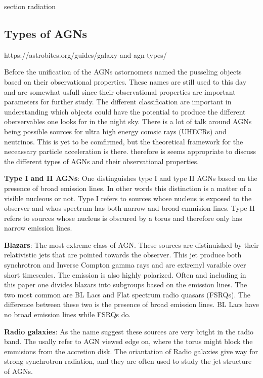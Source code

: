 \documentclass{article}
\begin{document}
section radiation




\subsection{Types of AGNs}

https://astrobites.org/guides/galaxy-and-agn-types/

Before the unification of the AGNs astornomers named the pusseling objects based on their observational properties. These 
names are still used to this day and are somewhat usfull since their observational properties are important parameters for further study. 
The different classification are important in understanding which objects could have the potential to produce the different oberservables one 
looks for in the night sky. There is a lot of talk around AGNs being possible sources for ultra high energy comsic rays (UHECRs) and neutrinos.
This is yet to be comfirmed, but the theoretical framework for the neceassary particle acceleration is there. therefore is seems appropriate to
discuss the different types of AGNs and their observational properties.

\textbf{Type I and II AGNs}:
One distinguishes type I and type II AGNs based on the presence of broad emission lines. In other words this distinction is
a matter of a visible nucleous or not. Type I refers to sources whose nucleus is exposed to the observer and whos spectrum
has both narrow and broad emmision lines. Type II refers to sources whose nucleus is obscured by a torus and therefore only has narrow emission lines.

\textbf{Blazars}:
The most extreme class of AGN. These sources are distinuished by their relativistic jets that are pointed towards the observer. 
This jet produce both synchrotron and Inverse Compton gamma rays and are extremyl varaible over short timescales. The
emission is also highly polarized. Often and including in this paper one divides blazars into subgroups based on the 
emission lines. The two most common are BL Lacs and Flat spectrum radio quasars (FSRQs). The difference between these two is the
presence of broad emission lines. BL Lacs have no broad emission lines while FSRQs do.

\textbf{Radio galaxies}:
As the name suggest these sources are very bright in the radio band. The usally refer to AGN viewed edge on, where the
torus might block the emmisions from the accretion disk. The oriantation of Radio galaxies give way for strong 
synchrotron radiation, and they are often used to study the jet structure of AGNs.
\end{document}

